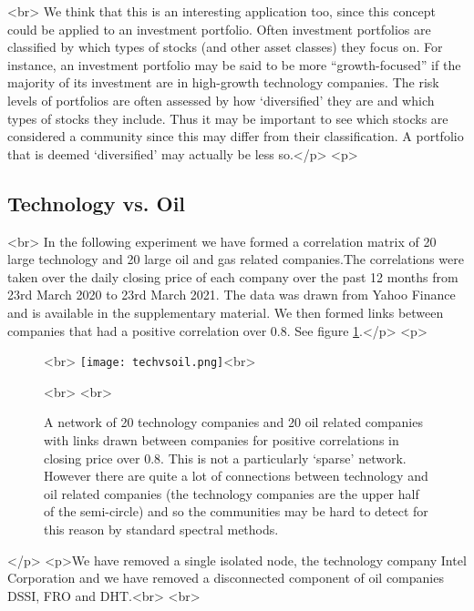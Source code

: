 \newline<br>
We think that this is an interesting application too, since this concept could be applied to an investment portfolio. Often investment portfolios are classified by which types of stocks (and other asset classes) they focus on. For instance, an investment portfolio may be said to be more “growth-focused” if the majority of its investment are in high-growth technology companies. The risk levels of portfolios are often assessed by how ‘diversified’ they are and which types of stocks they include. Thus it may be important to see which stocks are considered a community since this may differ from their classification. A portfolio that is deemed ‘diversified’ may actually be less so.</p>
<p>\subsection{Technology vs. Oil}<br>
In the following experiment we have formed a correlation matrix of 20 large technology and 20 large oil and gas related companies.The correlations were taken over the daily closing price of each company over the past 12 months from 23rd March 2020 to 23rd March 2021. The data was drawn from Yahoo Finance and is available in the supplementary material. We then formed links between companies that had a positive correlation over 0.8. See figure \ref{techvsoil1}.</p>
<p>\begin{figure}[h]%
\centering<br>
\texttt{[image: techvsoil.png]}<br>
\caption{A network of 20 technology companies and 20 oil related companies with links drawn between companies for positive correlations in closing price over 0.8. This is not a particularly ‘sparse’ network. However there are quite a lot of connections between technology and oil related companies (the technology companies are the upper half of the semi-circle) and so the communities may be hard to detect for this reason by standard spectral methods.}<br>
\label{techvsoil1}<br>
\end{figure}</p>
<p>We have removed a single isolated node, the technology company Intel Corporation and we have removed a disconnected component of oil companies DSSI, FRO and DHT.<br>
\newline<br>
